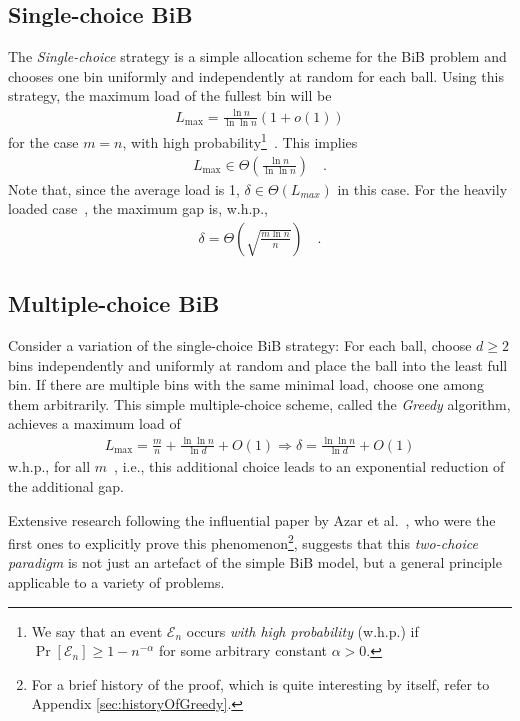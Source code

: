\documentclass[a4paper,12pt]{article}
\newcommand\load{L_{\mathrm{max}}}
\begin{document}
\subsection{Single-choice BiB}
\label{sec:single-choice}
The \emph{Single-choice} strategy is a simple allocation scheme for the BiB problem and chooses one bin uniformly and independently at random for each ball. Using this strategy, the maximum load of the fullest bin will be
\begin{align*}
\load = \frac{\ln n}{\ln \ln n}  \left(1 + o\left(1\right)\right)
\end{align*}
for the case $m=n$, with high probability\footnote{We say that an event $\mathcal E_n$ occurs \emph{with high probability} (w.h.p.) if $\Pr\left[\mathcal E_n \right] \geq 1 - n^{-\alpha}$ for some arbitrary constant $\alpha > 0$.}~\cite{RS98}. This implies
\begin{align*}
\load\in \Theta\left(\frac{\ln n}{\ln \ln n}\right)\quad .
\end{align*}
Note that, since the average load is 1, $\delta \in \Theta\left( L_{max} \right)$ in this case. For the heavily loaded case~\cite{RS98}, the maximum gap is, w.h.p.,
\begin{align*}
\delta = \Theta\left(\sqrt{\frac{m  \ln n}{n}}\right)\quad .
\end{align*}

\subsection{Multiple-choice BiB}
Consider a variation of the  single-choice BiB strategy: For each ball, choose $d \geq 2$ bins independently and uniformly at random and place the ball into the least full bin. If there are multiple bins with the same minimal load, choose one among them arbitrarily. This simple multiple-choice scheme, called the \emph{Greedy} algorithm, achieves a maximum load of
\begin{align*}
\load = \frac{m}{n}+\frac{\ln \ln n}{\ln d} + O(1) \Rightarrow \delta = \frac{\ln \ln n}{\ln d} + O(1)
\end{align*}
w.h.p., for all $m$~\cite{ABKU99, BCSV06}, i.e., this additional choice leads to an exponential reduction of the additional gap. 
\begin{comment}
Curiously, the exponential decrease in the gap is already achieved having just two choices (that is, $d=2$). Each additional choice decreases the bound for the maximum gap by just a constant factor~\cite{MRS01}. 
\end{comment}
Extensive research following the influential paper by Azar et al.~\cite{ABKU99}, who were the first ones to explicitly prove this phenomenon\footnote{For a brief history of the proof, which is quite interesting by itself, refer to Appendix \ref{sec:historyOfGreedy}.}, suggests that this \emph{two-choice paradigm} is not just an artefact of the simple BiB model, but a general principle applicable to a variety of problems. 
\end{document}
